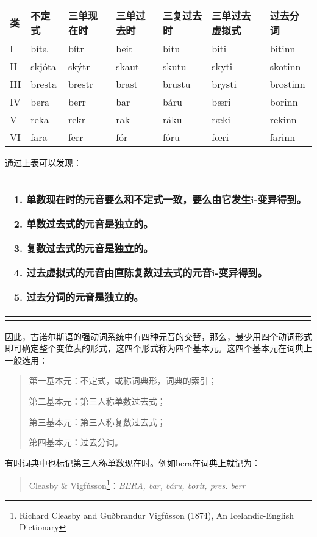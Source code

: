 \begin{longtable}{lllllll}
  \toprule
  类   & 不定式    & 三单现在时  & 三单过去时 & 三复过去时  & 三单过去虚拟式 & 过去分词     \\
  \midrule
  \endhead
  \bottomrule
  \endfoot
  I   & bíta   & bítr   & beit  & bitu   & biti    & bitinn   \\
  II  & skjóta & skýtr  & skaut & skutu  & skyti   & skotinn  \\
  III & bresta & brestr & brast & brustu & brysti  & brostinn \\
  IV  & bera   & berr   & bar   & báru   & bæri    & borinn   \\
  V   & reka   & rekr   & rak   & ráku   & ræki    & rekinn   \\
  VI  & fara   & ferr   & fór   & fóru   & fœri    & farinn   \\
\end{longtable}

通过上表可以发现：

\begin{longtable}{l}
  \toprule
  \begin{enumerate}\def\labelenumi{\arabic{enumi})}\item  单数现在时的元音要么和不定式一致，要么由它发生i-变异得到。\item  单数过去式的元音是独立的。\item  复数过去式的元音是独立的。\item  过去虚拟式的元音由直陈复数过去式的元音i-变异得到。\item  过去分词的元音是独立的。\end{enumerate} \\
  \midrule
  \endhead
  \bottomrule
  \endfoot
\end{longtable}

因此，古诺尔斯语的强动词系统中有四种元音的交替，那么，最少用四个动词形式即可确定整个变位表的形式，这四个形式称为四个基本元。这四个基本元在词典上一般选用：

\begin{quote}
  第一基本元：不定式，或称词典形，词典的索引；

  第二基本元：第三人称单数过去式；

  第三基本元：第三人称复数过去式；

  第四基本元：过去分词。
\end{quote}

有时词典中也标记第三人称单数现在时。例如bera在词典上就记为：

\begin{quote}
  Cleasby \& Vigfússon\footnote{Richard Cleasby and Guðbrandur Vigfússon
    (1874), An Icelandic-English Dictionary}：\emph{BERA, bar, báru,
    borit, pres. berr}
\end{quote}

